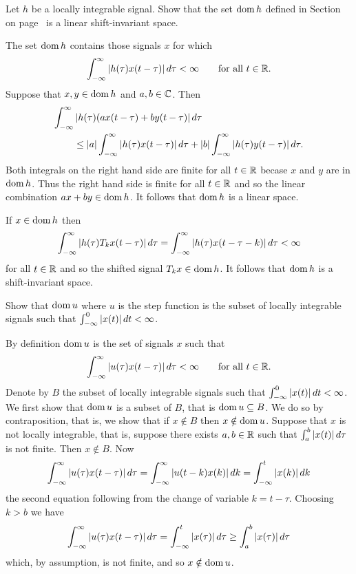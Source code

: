 \begin{excersizelist}
\begin{solution}
\begin{center}
\begin{tikzpicture}
  \end{tikzpicture}
\end{center}


\end{solution}


\item \label{exer:finhlinshiftinv}  Let $h$ be a locally integrable signal.  Show that the set $\dom h$ defined in Section~ on page~ is a linear shift-invariant space.
\begin{solution}
The set $\dom h$ contains those signals $x$ for which
\[
\int_{-\infty}^\infty \abs{h(\tau)x(t - \tau)} d\tau < \infty \qquad \text{for all $t \in \reals$.}
\]
Suppose that $x, y \in \dom h$ and $a, b \in \complex$.  Then
\begin{align*}
\int_{-\infty}^\infty &\abs{h(\tau)(ax(t - \tau) + by(t - \tau)} d\tau \\
&\leq \abs{a} \int_{-\infty}^\infty \abs{h(\tau) x(t - \tau)} d\tau + \abs{b} \int_{-\infty}^\infty \abs{h(\tau) y(t - \tau)} d\tau.
\end{align*}
Both integrals on the right hand side are finite for all $t \in \reals$ becase $x$ and $y$ are in $\dom h$.  Thus the right hand side is finite for all $t\in\reals$ and so the linear combination $ax + by \in \dom h$.  It follows that $\dom h$ is a linear space.

If $x \in \dom h$ then
\[
\int_{-\infty}^\infty \abs{h(\tau) T_k x(t - \tau)} d\tau = \int_{-\infty}^\infty \abs{h(\tau) x(t - \tau - k)} d\tau < \infty
\]
for all $t \in \reals$ and so the shifted signal $T_k x \in \dom h$.  It follows that $\dom h$ is a shift-invariant space.
\end{solution}

\item \label{exer:domuislcoalinintneg} Show that $\dom u$ where $u$ is the step function is the subset of locally integrable signals such that $\int_{-\infty}^0\abs{x(t)}dt < \infty$.
\begin{solution}
By definition $\dom u$ is the set of signals $x$ such that
\[
\int_{-\infty}^{\infty} \abs{u(\tau) x(t - \tau)} d\tau < \infty \qquad \text{for all $t \in \reals$}.
\]
Denote by $B$ the subset of locally integrable signals such that $\int_{-\infty}^0\abs{x(t)}dt < \infty$.  We first show that $\dom u$ is a subset of $B$, that is $\dom u \subseteq B$.  We do so by contraposition, that is, we show that if $x \notin B$ then $x \notin \dom u$.  Suppose that $x$ is not locally integrable, that is, suppose there exists $a, b \in \reals$ such that $\int_{a}^{b} \abs{x(t)} d\tau$ is not finite.  Then $x \notin B$.  Now
\[
\int_{-\infty}^{\infty} \abs{u(\tau) x(t - \tau)} d\tau = \int_{-\infty}^{\infty} \abs{u(t - k) x(k)} dk = \int_{-\infty}^{t} \abs{x(k)} dk
\]
the second equation following from the change of variable $k = t - \tau$.  Choosing $k > b$ we have
\[
\int_{-\infty}^{\infty} \abs{u(\tau) x(t - \tau)} d\tau = \int_{-\infty}^{t} \abs{x(\tau)} d\tau \geq \int_{a}^{b} \abs{x(\tau)} d\tau
\]
which, by assumption, is not finite, and so $x \notin \dom u$.  


\end{solution}
\end{excersizelist}
